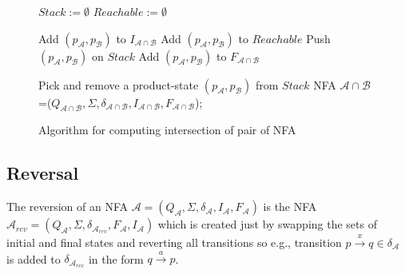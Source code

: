 \begin{figure}[bt]
\begin{algorithm}[H]
	\label{algIntersection}

  $Stack := \emptyset$\;
  $Reachable := \emptyset$\;

   {
    Add $(p_\mathcal{A},p_\mathcal{B})$ to $I_{\mathcal{A} \cap \mathcal{B}}$\;
     {
      Add $(p_\mathcal{A},p_\mathcal{B})$ to $Reachable$\;
      Push $(p_\mathcal{A},p_\mathcal{B})$ on $Stack$\; 
    }
     {
      Add $(p_\mathcal{A},p_\mathcal{B})$ to $F_{\mathcal{A}\cap\mathcal{B}}$
    }
  }
	
   {
			Pick and remove a product-state $(p_\mathcal{A},p_\mathcal{B})$ from $Stack$\;
	 }
		\Return NFA $\mathcal{A}\cap\mathcal{B}$=($Q_{\mathcal{A}\cap\mathcal{B}},\Sigma,\delta_{\mathcal{A}\cap\mathcal{B}},
      I_{\mathcal{A}\cap\mathcal{B}},F_{\mathcal{A}\cap\mathcal{B}}$);
	\caption{Algorithm for computing intersection of pair of NFA}
\end{algorithm}
\end{figure}

\subsection{Reversal}
The reversion of an NFA $\mathcal{A}=(Q_\mathcal{A},\Sigma,\delta_\mathcal{A},I_\mathcal{A},F_\mathcal{A})$ is the NFA 
$\mathcal{A}_{rev}=(Q_{\mathcal{A}},\Sigma,\delta_{\mathcal{A}_{rev}},F_{\mathcal{A}},I_{\mathcal{A}})$ 
which is created just by swapping the sets of initial and final states and reverting all transitions  so e.g., transition
$p\xrightarrow{x}q \in \delta_\mathcal{A}$ is added to $\delta_{\mathcal{A}_{rev}}$ in the form $q\xrightarrow{a}p$.

